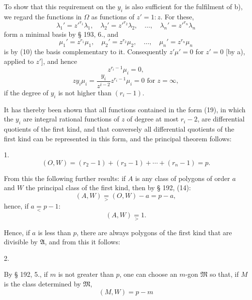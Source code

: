 
To show that this requirement on the $y_i$ is also sufficient for the
 fulfilment of b), we regard the functions in $\Omega$
as functions of $z' = 1:z$. For these,
\[
\lambda_1' = z'^{r_1}\lambda_1,\quad \lambda_2' = z'^{r_2}\lambda_2,\quad \ldots,\quad \lambda_n' = z'^{r_n}\lambda_n
\]
form a minimal basis by § 193, 6., and
\[
\mu_1' = z^{r_1}\mu_1,\quad \mu_2' = z^{r_2}\mu_2,\quad \ldots,\quad \mu_n' = z^{r_n}\mu_n
\]
is by (10) the basis complementary to it. Consequently $z'\mu' = 0$
for $z' = 0$ [by a), applied to $z'$], and hence
\[
z^{r_i-1}\mu_i = 0,
\]
\[
zy_i\mu_i = \frac{y_i}{z^{i-2}}z^{r_i-1}\mu_i = 0 \text{ for } z = \infty, %
\]
if the degree of $y_i$ is not higher than $(r_i-1)$. %

It has thereby been shown that all functions contained in the
 form (19), in which the $y_i$ are integral rational functions
of $z$ of degree at most $r_i-2$, are differential quotients
of the first kind, and that conversely all differential quotients
of the first kind can be represented in this form, and
the principal theorem follows:

1. 
\[
(O,W) = (r_2-1)+(r_3-1)+\cdots+(r_n-1) = p.
\]

From this the following further results: if $A$ is any
class of polygons of order $a$ and $W$ the principal class of the
first kind, then by § 192, (14):
\[
(A, W) \mathrel{\underset{>}{=}} (O, W) - a = p - a, %
\]
hence, if $a \mathrel{\underset{<}{=}} p - 1$: %
\[
(A, W) \mathrel{\underset{>}{=}} 1. %
\]

Hence, if $a$ is less than $p$, there are always polygons of the first
kind that are divisible by $\mathfrak{A}$, and from this it follows:

2. 

By § 192, 5., if $m$ is not greater than $p$, one can choose
an $m$-gon $\mathfrak{M}$ so that, if $M$ is the class determined by $\mathfrak{M}$,
\[
(M, W) = p - m
\]
